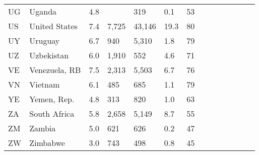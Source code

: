 \begin{scriptsize}
\begin{center}
\begin{longtable}{llllllllllllll}
UG&Uganda&4.8&&319&0.1&53\\
US&United States&7.4&7,725&43,146&19.3&80\\
UY&Uruguay&6.7&940&5,310&1.8&79\\
UZ&Uzbekistan&6.0&1,910&552&4.6&71\\
VE&Venezuela, RB&7.5&2,313&5,503&6.7&76\\
VN&Vietnam&6.1&485&685&1.1&79\\
YE&Yemen, Rep.&4.8&313&820&1.0&63\\
ZA&South Africa&5.8&2,658&5,149&8.7&55\\
ZM&Zambia&5.0&621&626&0.2&47\\
ZW&Zimbabwe&3.0&743&498&0.8&45\\
\end{longtable} \end{center} \end{scriptsize}   
